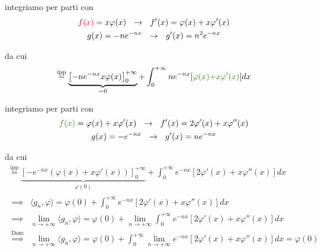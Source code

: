 \begin{enumerate}
integriamo per parti con
\begin{gather*}
\textcolor[rgb]{0.82,0.01,0.11}{f}\textcolor[rgb]{0.82,0.01,0.11}{(}\textcolor[rgb]{0.82,0.01,0.11}{x}\textcolor[rgb]{0.82,0.01,0.11}{)} = x\varphi (x) \ \ \rightarrow \ \ f'(x) = \varphi (x) + x\varphi '(x)\\
g(x) = - ne^{ - nx} \ \ \rightarrow \ \ g'(x) = n^{2} e^{ - nx}
\end{gather*}

da cui
\begin{equation*}
\overset{\text{ipp}}{ = }\underbrace{\left[ - ne^{ - nx} x\varphi (x)\right]^{ + \infty }_{0}}_{ = 0} + \int ^{ + \infty }_{0} ne^{ - nx}[\textcolor[rgb]{0.25,0.46,0.02}{\varphi }\textcolor[rgb]{0.25,0.46,0.02}{(}\textcolor[rgb]{0.25,0.46,0.02}{x}\textcolor[rgb]{0.25,0.46,0.02}{)}\textcolor[rgb]{0.25,0.46,0.02}{ + x\varphi '}\textcolor[rgb]{0.25,0.46,0.02}{(}\textcolor[rgb]{0.25,0.46,0.02}{x}\textcolor[rgb]{0.25,0.46,0.02}{)}] dx
\end{equation*}

integriamo per parti con
\begin{gather*}
\textcolor[rgb]{0.25,0.46,0.02}{f}\textcolor[rgb]{0.25,0.46,0.02}{(}\textcolor[rgb]{0.25,0.46,0.02}{x}\textcolor[rgb]{0.25,0.46,0.02}{)} = \varphi (x) + x\varphi '(x) \ \ \rightarrow \ \ f'(x) = 2\varphi '(x) + x\varphi ''(x)\\
g(x) = - e^{ - nx} \ \ \rightarrow \ \ g'(x) = ne^{ - nx}
\end{gather*}

da cui
\begin{gather*}
\overset{\text{ipp}}{ = }\underbrace{\left[ - e^{ - nx}(\varphi (x) + x\varphi '(x))\right]^{ + \infty }_{0}}_{\varphi (0)} + \int ^{ + \infty }_{0} e^{ - nx}[ 2\varphi '(x) + x\varphi ''(x)] dx\\
\begin{aligned}
\implies  & \langle g_{n} ,\varphi \rangle = \varphi (0) + \int ^{ + \infty }_{0} e^{ - nx}[ 2\varphi '(x) + x\varphi ''(x)] dx\\
\implies  & \lim\limits _{n\rightarrow + \infty } \langle g_{n} ,\varphi \rangle = \varphi (0) + \lim\limits _{n\rightarrow + \infty }\int ^{ + \infty }_{0} e^{ - nx}[ 2\varphi '(x) + x\varphi ''(x)] dx\\
\overset{\text{Dom}}{\implies } & \lim\limits _{n\rightarrow + \infty } \langle g_{n} ,\varphi \rangle = \varphi (0) + \int ^{ + \infty }_{0}\lim\limits _{n\rightarrow + \infty } e^{ - nx}[ 2\varphi '(x) + x\varphi ''(x)] dx = \varphi (0)
\end{aligned}
\end{gather*}


\end{enumerate}
